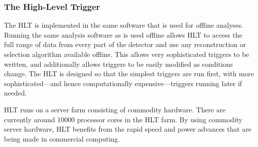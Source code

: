 \subsubsection{The High-Level Trigger}

The HLT is implemented in the same software that is used for offline analyses.
Running the same analysis software as is used offline allows HLT to access the
full range of data from every part of the detector and use any reconstruction
or selection algorithm available offline. This allows very sophisticated
triggers to be written, and additionally allows triggers to be easily modified
as conditions change. The HLT is designed so that the simplest triggers are run
first, with more sophisticated---and hence computationally expensive---triggers
running later if needed.

HLT runs on a server farm consisting of commodity hardware. There are currently
around 10000 processor cores in the HLT farm. By using commodity server
hardware, HLT benefits from the rapid speed and power advances that are being
made in commercial computing.
